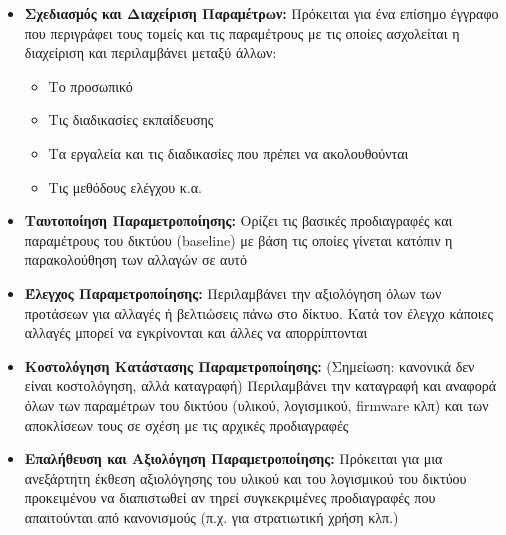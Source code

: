 \begin{itemize}
\item \textbf{Σχεδιασμός και Διαχείριση Παραμέτρων:} Πρόκειται για ένα επίσημο έγγραφο που περιγράφει τους τομείς και τις παραμέτρους με τις οποίες ασχολείται η διαχείριση και περιλαμβάνει μεταξύ άλλων:
\begin{itemize}
\item Το προσωπικό
\item Τις διαδικασίες εκπαίδευσης
\item Τα εργαλεία και τις διαδικασίες που πρέπει να ακολουθούνται
\item Τις μεθόδους ελέγχου κ.α.
\end{itemize}
\item \textbf{Ταυτοποίηση Παραμετροποίησης:} Ορίζει τις βασικές προδιαγραφές και παραμέτρους του δικτύου (baseline) με βάση τις οποίες γίνεται κατόπιν η παρακολούθηση των αλλαγών σε αυτό
\item \textbf{Έλεγχος Παραμετροποίησης:} Περιλαμβάνει την αξιολόγηση όλων των προτάσεων για αλλαγές ή βελτιώσεις πάνω στο δίκτυο. Κατά τον έλεγχο κάποιες αλλαγές μπορεί να εγκρίνονται και άλλες να απορρίπτονται
\item \textbf{Κοστολόγηση Κατάστασης Παραμετροποίησης:} (Σημείωση: κανονικά δεν είναι κοστολόγηση, αλλά καταγραφή) Περιλαμβάνει την καταγραφή και αναφορά όλων των παραμέτρων του δικτύου (υλικού, λογισμικού, firmware κλπ) και των αποκλίσεων τους σε σχέση με τις αρχικές προδιαγραφές
\item \textbf{Επαλήθευση και Αξιολόγηση Παραμετροποίησης:} Πρόκειται για μια ανεξάρτητη έκθεση αξιολόγησης του υλικού και του λογισμικού του δικτύου προκειμένου να διαπιστωθεί αν τηρεί συγκεκριμένες προδιαγραφές που απαιτούνται από κανονισμούς (π.χ. για στρατιωτική χρήση κλπ.)
\end{itemize}